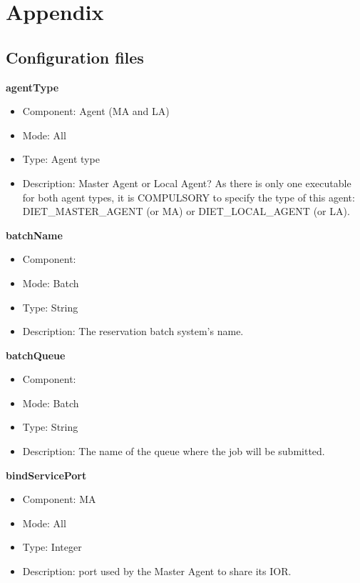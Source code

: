 
\chapter{Appendix}
\label{ch:appendix}
\section{Configuration files}

\begin{description}


\item{\bf{agentType}}
  \begin{itemize}
  \item Component: Agent (MA and LA)
  \item Mode: All
  \item Type: Agent type
  \item Description: Master Agent or Local Agent? As there is only one
    executable for both agent types, it is COMPULSORY to specify the type
    of this agent: DIET\_MASTER\_AGENT (or MA) or DIET\_LOCAL\_AGENT (or
    LA).
  \end{itemize}

\item{\bf{batchName}}
  \begin{itemize}
  \item Component: \sed
  \item Mode: Batch
  \item Type: String
  \item Description: The reservation batch system's name.
  \end{itemize}

\item{\bf{batchQueue}}
  \begin{itemize}
  \item Component: \sed
  \item Mode: Batch
  \item Type: String
  \item Description: The name of the queue where the job will be submitted.
  \end{itemize}

\item{\bf{bindServicePort}}
  \begin{itemize}
  \item Component: MA
  \item Mode: All
  \item Type: Integer
  \item Description: port used by the Master Agent to share its IOR.
  \end{itemize}


\end{description}
